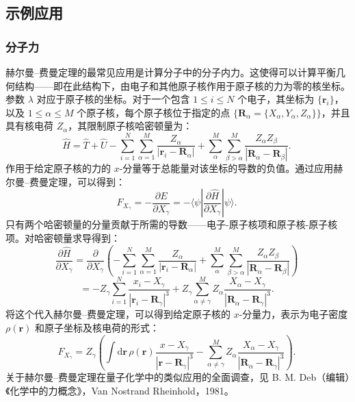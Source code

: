 \subsection{示例应用}
\subsubsection{分子力}
赫尔曼–费曼定理的最常见应用是计算分子中的分子内力。这使得可以计算平衡几何结构——即在此结构下，由电子和其他原子核作用于原子核的力为零的核坐标。参数 \(\lambda\) 对应于原子核的坐标。对于一个包含 \(1 \leq i \leq N\) 个电子，其坐标为 \(\{\mathbf{r}_i\}\)，以及 \(1 \leq \alpha \leq M\) 个原子核，每个原子核位于指定的点 \(\{\mathbf{R}_{\alpha} = \{X_{\alpha}, Y_{\alpha}, Z_{\alpha}\}\}\)，并且具有核电荷 \(Z_{\alpha}\)，其限制原子核哈密顿量为：
\[
\hat{H} = \hat{T} + \hat{U} - \sum_{i=1}^{N} \sum_{\alpha=1}^{M} \frac{Z_{\alpha}}{|\mathbf{r}_i - \mathbf{R}_{\alpha}|} + \sum_{\alpha}^M \sum_{\beta > \alpha}^M \frac{Z_{\alpha} Z_{\beta}}{|\mathbf{R}_{\alpha} - \mathbf{R}_{\beta}|}.~
\]
作用于给定原子核的力的 \(x\)-分量等于总能量对该坐标的导数的负值。通过应用赫尔曼–费曼定理，可以得到：
\[
F_{X_{\gamma}} = -\frac{\partial E}{\partial X_{\gamma}} = -\langle \psi | \frac{\partial \hat{H}}{\partial X_{\gamma}} | \psi \rangle.~
\]
只有两个哈密顿量的分量贡献于所需的导数——电子-原子核项和原子核-原子核项。对哈密顿量求导得到：
\[
\frac{\partial \hat{H}}{\partial X_{\gamma}} = \frac{\partial}{\partial X_{\gamma}} \left( - \sum_{i=1}^{N} \sum_{\alpha=1}^{M} \frac{Z_{\alpha}}{|\mathbf{r}_i - \mathbf{R}_{\alpha}|} + \sum_{\alpha}^M \sum_{\beta > \alpha}^M \frac{Z_{\alpha} Z_{\beta}}{|\mathbf{R}_{\alpha} - \mathbf{R}_{\beta}|} \right)~
\]
\[
= -Z_{\gamma} \sum_{i=1}^{N} \frac{x_i - X_{\gamma}}{|\mathbf{r}_i - \mathbf{R}_{\gamma}|^3} + Z_{\gamma} \sum_{\alpha \neq \gamma}^M Z_{\alpha} \frac{X_{\alpha} - X_{\gamma}}{|\mathbf{R}_{\alpha} - \mathbf{R}_{\gamma}|^3}.~
\]
将这个代入赫尔曼–费曼定理，可以得到给定原子核的 \(x\)-分量力，表示为电子密度 \(\rho(\mathbf{r})\) 和原子坐标及核电荷的形式：
\[
F_{X_{\gamma}} = Z_{\gamma} \left( \int \mathrm{d} \mathbf{r} \, \rho(\mathbf{r}) \frac{x - X_{\gamma}}{|\mathbf{r} - \mathbf{R}_{\gamma}|^3} - \sum_{\alpha \neq \gamma}^M Z_{\alpha} \frac{X_{\alpha} - X_{\gamma}}{|\mathbf{R}_{\alpha} - \mathbf{R}_{\gamma}|^3} \right).~
\]
关于赫尔曼–费曼定理在量子化学中的类似应用的全面调查，见 B. M. Deb（编辑）《化学中的力概念》，Van Nostrand Rheinhold，1981。
